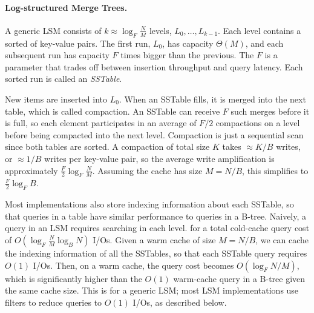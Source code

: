 

\paragraph{Log-structured Merge Trees.} 
A generic LSM consists of $k\approx \log_F \frac{N}{M}$ levels, $L_0,\ldots,
L_{k-1}$. Each level contains a sorted  of key-value pairs.
The first run, $L_0$, has capacity $\Theta(M)$, and each subsequent
run has capacity $F$ times bigger than the previous. 
The  $F$ is a
parameter that trades off between insertion throughput and query
latency.  Each sorted run is called an \emph{SSTable}.

New items are inserted into $L_0$.  When an SSTable fills, it is
merged into the next table, which is called compaction. An SSTable can
receive $F$ such merges before it is full, so each element
participates in an average of $F/2$ compactions on a level before
being compacted into the next level.  Compaction is just a sequential
scan since both tables are sorted.  A compaction of total size $K$
takes $\approx K/B$ writes, or $\approx 1/B$ writes per key-value
pair, so the average write amplification is approximately
$\frac{F}{2}\log_F \frac{N}{M}$.  Assuming the cache has size $M=N/B$,
this simplifies to $\frac{F}{2}\log_F B$.

Most implementations also store indexing information about each
SSTable, so that queries in a table have similar performance to
queries in a B-tree.  Naively, a query in an LSM requires searching in
each level.  
for a total cold-cache query cost of $O(\log_F \frac{N}{M} \log_B N)$
I/Os.  Given a warm cache of size $M=N/B$, we can cache the indexing
information of all the SSTables, so that each SSTable query requires
$O(1)$ I/Os.  Then, on a warm cache, the query cost becomes $O(\log_F
N/M)$, which is significantly higher than the $O(1)$ warm-cache query
in a B-tree given the same cache size.  This is for a generic LSM;
most LSM implementations use filters to reduce queries to $O(1)$ I/Os,
as described below.


